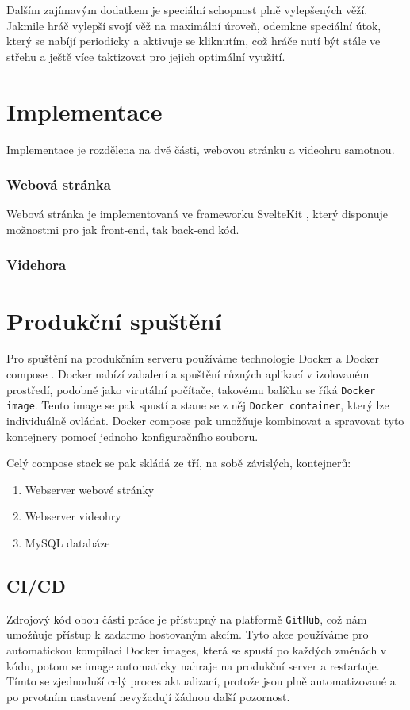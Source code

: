 \documentclass{article}[12pt]
\begin{document}
Dalším zajímavým dodatkem je speciální schopnost plně vylepšených věží. Jakmile hráč vylepší svojí věž na maximální úroveň, odemkne speciální útok, který se nabíjí periodicky a aktivuje se kliknutím, což hráče nutí být stále ve střehu a ještě více taktizovat pro jejich optimální využití.

\section{Implementace}

Implementace je rozdělena na dvě části, webovou stránku a videohru samotnou.

\subsubsection{Webová stránka}
Webová stránka je implementovaná ve frameworku SvelteKit \cite{sveltekit}, který disponuje možnostmi pro jak front-end, tak back-end kód.


\subsubsection{Videhora}

\section{Produkční spuštění}

Pro spuštění na produkčním serveru používáme technologie Docker \cite{docker} a Docker compose \cite{docker-compose}. Docker nabízí zabalení a spuštění různých aplikací v izolovaném prostředí, podobně jako virutální počítače, takovému balíčku se říká \verb|Docker image|. Tento image se pak spustí a stane se z něj \verb|Docker container|, který lze individuálně ovládat. Docker compose pak umožňuje kombinovat a spravovat tyto kontejnery pomocí jednoho konfiguračního souboru.

Celý compose stack se pak skládá ze tří, na sobě závislých, kontejnerů:
\begin{enumerate}
	\item Webserver webové stránky
	\item Webserver videohry
	\item MySQL databáze
\end{enumerate}

\subsection{CI/CD}
Zdrojový kód obou části práce je přístupný na platformě \verb|GitHub|, což nám umožňuje přístup k zadarmo hostovaným akcím. Tyto akce používáme pro automatickou kompilaci Docker images, která se spustí po každých změnách v kódu, potom se image automaticky nahraje na produkční server a restartuje. Tímto se zjednoduší celý proces aktualizací, protože jsou plně automatizované a po prvotním nastavení nevyžadují žádnou další pozornost.


\newpage

\printbibliography[title=Zdroje]
\end{document}
